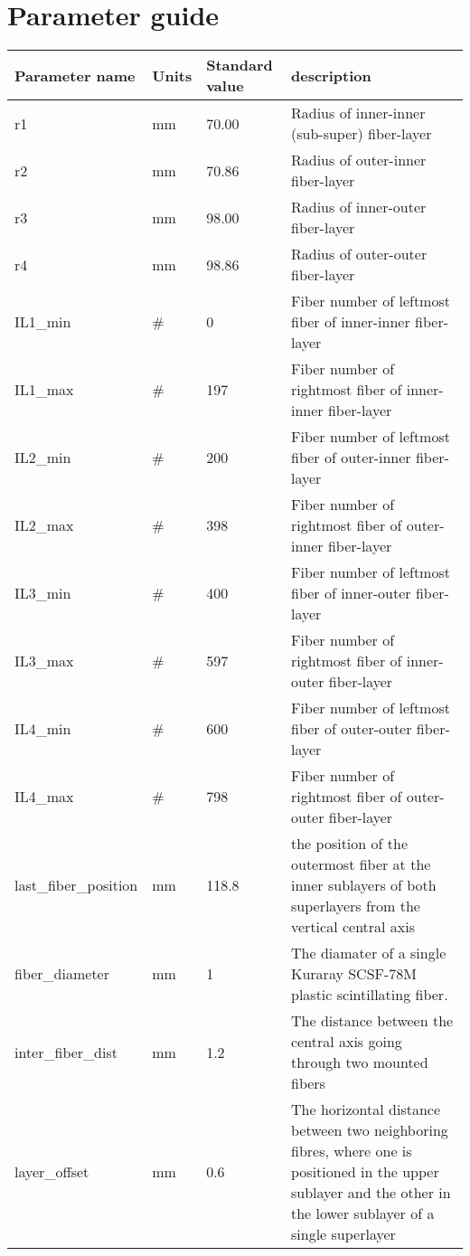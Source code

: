 \documentclass[article,9pt,oneside]{article}
\begin{document}
\section*{Parameter guide}

\begin{center}
	\begin{tabular}{|p{4cm}|p{1.5cm}|p{3cm}|p{8cm}|} \hline
		\textbf{Parameter name} & \textbf{ Units } & \textbf{Standard value} & \textbf{description} \\ \hline 
		  r1 & mm & 70.00 & Radius of inner-inner (sub-super) fiber-layer\\ \hline
		  r2 & mm & 70.86 &Radius of outer-inner  fiber-layer\\  \hline
		  r3 & mm & 98.00 & Radius of inner-outer fiber-layer\\ \hline
		  r4 & mm & 98.86 &  Radius of outer-outer fiber-layer\\  \hline
		  IL1\_min&\#& 0 & Fiber number of leftmost fiber of inner-inner fiber-layer \\  \hline
		  IL1\_max&\#& 197 &Fiber number of rightmost fiber of inner-inner fiber-layer  \\  \hline
		  IL2\_min&\#& 200 &Fiber number of leftmost fiber of outer-inner fiber-layer  \\ \hline
		  IL2\_max&\#& 398 & Fiber number of rightmost fiber of outer-inner fiber-layer \\ \hline
		  IL3\_min&\#& 400 & Fiber number of leftmost fiber of inner-outer fiber-layer \\ \hline
		  IL3\_max&\#& 597 &Fiber number of rightmost fiber of inner-outer fiber-layer  \\ \hline
 		  IL4\_min&\#& 600 &Fiber number of leftmost fiber of outer-outer fiber-layer  \\ \hline
		  IL4\_max&\#& 798 &Fiber number of rightmost fiber of outer-outer fiber-layer   \\ \hline
		  last\_fiber\_position&mm& 118.8 & the position of the outermost fiber at the inner sublayers of both superlayers from the vertical central axis \\ \hline
		  fiber\_diameter&mm& 1& The diamater of a single Kuraray SCSF-78M plastic scintillating fiber.\\ \hline
		  inter\_fiber\_dist&mm& 1.2& The distance between the central axis going through two mounted fibers\\ \hline
		  layer\_offset&mm& 0.6 & The horizontal distance between two neighboring fibres, where one is positioned in the upper sublayer and the other in the lower sublayer of a single superlayer   \\ \hline

\end{tabular}
\end{center}
\end{document}
